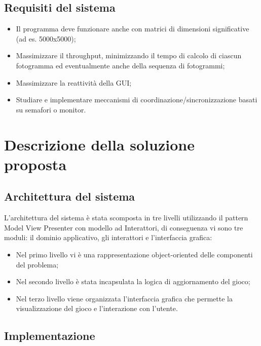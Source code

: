 \documentclass[a4paper]{article}
\begin{document}
\subsection{Requisiti del sistema}\label{requisiti-del-sistema}

\begin{itemize}
\item
  Il programma deve funzionare anche con matrici di dimensioni significative (ad es. 5000x5000);
\item
  Massimizzare il throughput, minimizzando il tempo di calcolo di ciascun fotogramma ed eventualmente anche della sequenza di fotogrammi;
\item
  Massimizzare la reattività della GUI;
\item
  Studiare e implementare meccanismi di coordinazione/sincronizzazione basati su semafori o monitor.
\end{itemize}

\section{Descrizione della soluzione proposta}\label{descrizione-della-soluzione-proposta}

\subsection{Architettura del sistema}\label{architettura-del-sistema}

L'architettura del sistema è stata scomposta in tre livelli utilizzando il pattern Model View Presenter con modello ad Interattori, di conseguenza vi sono tre moduli: il dominio applicativo, gli interattori e l'interfaccia grafica:

\begin{itemize}
\item
  Nel primo livello vi è una rappresentazione object-oriented delle componenti del problema;
\item
  Nel secondo livello è stata incapsulata la logica di aggiornamento del gioco;
\item
  Nel terzo livello viene organizzata l'interfaccia grafica che permette la visualizzazione del gioco e l'interazione con l'utente.
\end{itemize}

\subsection{Implementazione}\label{implementazione}
\end{document}
